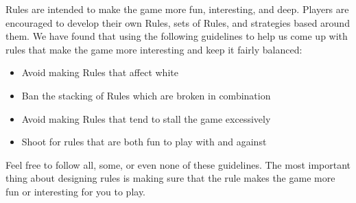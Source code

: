\documentclass[../rulebook.tex]{subfiles}
\begin{document}
Rules are intended to make the game more fun, interesting, and deep.
Players are encouraged to develop their own Rules, sets of Rules,
and strategies based around them.
We have found that using the following guidelines to help us come up
with rules that make the game more interesting and keep it fairly balanced:
\begin{itemize}
\item Avoid making Rules that affect white
\item Ban the stacking of Rules which are broken in combination
\item Avoid making Rules that tend to stall the game excessively
\item Shoot for rules that are both fun to play with and against
\end{itemize}
Feel free to follow all, some, or even none of these guidelines.
The most important thing about designing rules is making sure
that the rule makes the game more fun or interesting for you to play.
\end{document}

